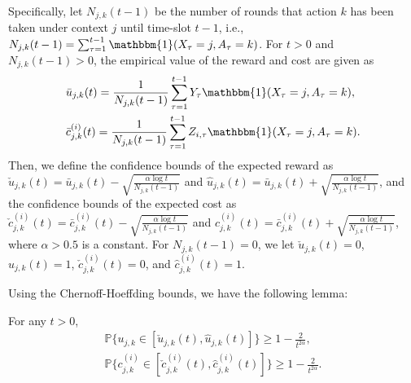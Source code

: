 Specifically, let $N_{j,k}(t-1)$ be the number of rounds that action $k$ has been taken under context $j$ until time-slot $t-1$, i.e.,
$N_{j,k}(t-1) =  \sum_{\tau = 1}^{t-1}\mathbbm{1}(X_{\tau} = j, A_\tau = k)$. For $t > 0$ and $N_{j,k}(t-1) > 0$, the empirical value of the reward and cost are given as
\begin{align}
&\bar{u}_{j,k}(t) =  \frac{1}{N_{j,k}(t-1)}\sum_{\tau = 1}^{t - 1} Y_\tau \mathbbm{1}(X_{\tau} = j, A_\tau = k), \nonumber \\
&\bar{c}_{j,k}^{(i)}(t) =  \frac{1}{N_{j,k}(t-1)}\sum_{\tau = 1}^{t - 1} Z_{i,\tau} \mathbbm{1}(X_\tau = j, A_\tau = k). \nonumber
\end{align}
Then, we define the confidence bounds of the expected reward as 
$\check{u}_{j,k}(t) = \bar{u}_{j,k}(t) - \sqrt{\frac{\alpha\log t}{N_{j,k}(t-1)}}$ and $\hat{u}_{j,k}(t) = \bar{u}_{j,k}(t) + \sqrt{\frac{\alpha \log t}{N_{j,k}(t-1)}}$, 
and the confidence bounds of the expected cost as $\check{c}_{j,k}^{(i)}(t) = \bar{c}_{j,k}^{(i)}(t) - \sqrt{\frac{\alpha \log t}{N_{j,k}(t-1)}}$ 
and $\hat{c}_{j,k}^{(i)}(t) = \bar{c}_{j,k}^{(i)}(t) + \sqrt{\frac{\alpha \log t}{N_{j,k}(t-1)}}$, where $\alpha > 0.5$ is a constant.
For $N_{j,k}(t-1) = 0$, we let $\check{u}_{j,k}(t) = 0$, $\hat{u}_{j,k}(t) = 1$, $\check{c}_{j,k}^{(i)}(t) = 0$, and $\hat{c}_{j,k}^{(i)}(t) = 1$.

Using the Chernoff-Hoeffding bounds, we have the following lemma:
\begin{lemma}
For any $t > 0$,
\begin{eqnarray}
\mathbb{P}\{u_{j,k} \in [\check{u}_{j,k}(t), \hat{u}_{j,k}(t)] \} \geq 1 - \frac{2}{t^{2\alpha}}, \nonumber \\
\mathbb{P}\{c^{(i)}_{j,k} \in [\check{c}^{(i)}_{j,k}(t), \hat{c}^{(i)}_{j,k}(t)] \} \geq 1 - \frac{2}{t^{2\alpha}}. \nonumber
\end{eqnarray}
\end{lemma}

